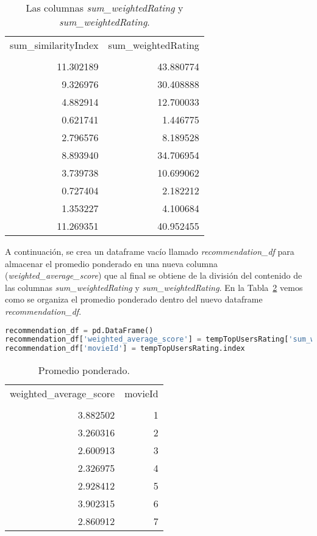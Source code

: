\documentclass{uimppracticas}
\begin{document}
\begin{table}[H]
	\centering
	\begin{tabular}{rr}
		\toprule
		sum\_similarityIndex &  sum\_weightedRating \\
		&                     \\
		\midrule
		11.302189 &           43.880774 \\
		9.326976 &           30.408888 \\
		4.882914 &           12.700033 \\
		0.621741 &            1.446775 \\
		2.796576 &            8.189528 \\
		8.893940 &           34.706954 \\
		3.739738 &           10.699062 \\
		0.727404 &            2.182212 \\
		1.353227 &            4.100684 \\
		11.269351 &           40.952455 \\
		\bottomrule
	\end{tabular}
	\caption{Las columnas \textit{sum\_weightedRating} y \textit{sum\_weightedRating}.}
	\label{sums}
\end{table}

A continuación, se crea un dataframe vacío llamado \textit{recommendation\_df} para almacenar el promedio ponderado en una nueva columna (\textit{weighted\_average\_score}) que al final se obtiene de la división del contenido de las columnas \textit{sum\_weightedRating} y \textit{sum\_weightedRating}. En la Tabla~\ref{promedio_ponderado_resultado} vemos como se organiza el promedio ponderado dentro del nuevo dataframe \textit{recommendation\_df}.

\begin{lstlisting}[language=python, basicstyle=\small]
recommendation_df = pd.DataFrame()
recommendation_df['weighted_average_score'] = tempTopUsersRating['sum_weightedRating']/tempTopUsersRating['sum_similarityIndex']
recommendation_df['movieId'] = tempTopUsersRating.index
\end{lstlisting}

\begin{table}[H]
	\centering
	\begin{tabular}{rr}
		\toprule
		weighted\_average\_score &  movieId \\
		&          \\
		\midrule
		3.882502 &        1 \\
		3.260316 &        2 \\
		2.600913 &        3 \\
		2.326975 &        4 \\
		2.928412 &        5 \\
		3.902315 &        6 \\
		2.860912 &        7 \\
		\bottomrule
	\end{tabular}
	\caption{Promedio ponderado.}
	\label{promedio_ponderado_resultado}
\end{table}
\end{document}
